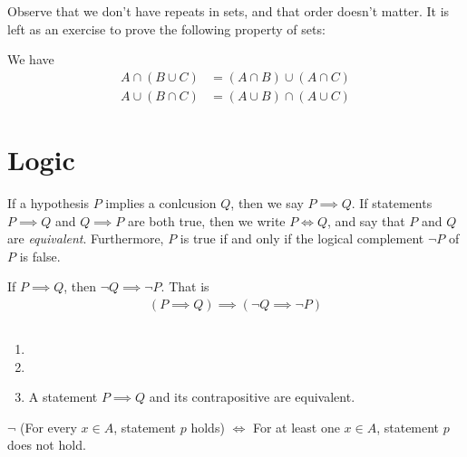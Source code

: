 Observe that we don't have repeats in sets, and that order doesn't matter.
It is left as an exercise to prove the following property of sets:
\begin{lemma}
We have
\begin{equation*}
\begin{split}
A \cap (B \cup C) &= (A \cap B)  \cup (A \cap C) \\
A \cup (B \cap C) &= (A \cup B)  \cap (A \cup C)
\end{split}
\end{equation*}
\end{lemma}
\section{Logic}
\begin{definition}
If a hypothesis $P$ implies a conlcusion $Q$, then we say $P \implies Q$.
If statements $P \implies Q$ and $Q \implies P$ are both true, then we
write $P \iff Q$, and say that $P$ and $Q$ are \emph{equivalent}.
Furthermore, $P$ is true if and only if the logical complement $\neg P$ of $P$ is
false.
\end{definition}
\begin{lemma}[Contrapositive]\label{lem:contrapositive}
If $P \implies Q $, then $\neg Q \implies \neg P$. That is
\begin{equation*}
\begin{split}
( P \implies Q )  \implies \left( \neg Q  \implies \neg P\right)
\end{split}
\end{equation*}
\end{lemma}
\begin{example} $ $
\begin{enumerate}
  \item {}
  \item {}
\item A statement $P \implies Q$ and its contrapositive are equivalent.\end{enumerate}
\end{example}
\begin{corollary}
$\neg$ (For every $x \in A$, statement $p$ holds)
$\iff$ For at least one $x \in A$, statement $p$ does not hold.
\end{corollary}
